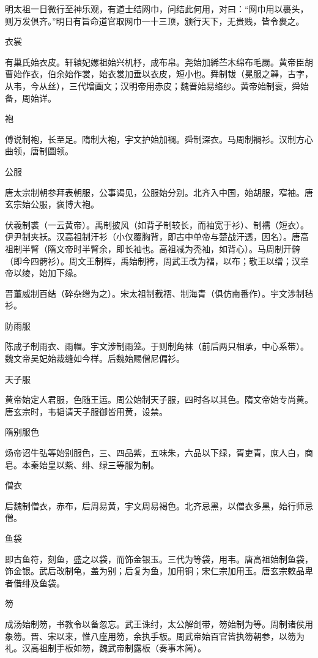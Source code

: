 \documentclass[a4paper,12pt,UTF8,twoside]{ctexbook}
\begin{document}
    明太祖一日微行至神乐观，有道士结网巾，问结此何用，对曰：“网巾用以裹头，则万发俱齐。”明日有旨命道官取网巾一十三顶，颁行天下，无贵贱，皆令裹之。
    
    衣裳
    
    有巢氏始衣皮。轩辕妃嫘祖始兴机杼，成布帛。尧始加絺苎木绵布毛罽。黄帝臣胡曹始作衣，伯余始作裳，始衣裳加垂以衣皮，短小也。舜制韨（冕服之韠，古字，从韦，今从丝），三代增画文；汉明帝用赤皮；魏晋始易络纱。黄帝始制衮，舜始备，周始详。
    
    袍
    
    傅说制袍，长至足。隋制大袍，宇文护始加襕。舜制深衣。马周制襕衫。汉制方心曲领，唐制圆领。
    
    公服
    
    唐太宗制朝参拜表朝服，公事谒见，公服始分别。北齐入中国，始胡服，窄袖。唐玄宗始公服，褒博大袍。
    
    伏羲制裘（一云黄帝）。禹制披风（如背子制较长，而袖宽于衫）、制襦（短衣）。伊尹制夹袄。汉高祖制汗衫（小仅覆胸背，即古中单帝与楚战汗透，因名）。唐高祖制半臂（隋文帝时半臂余，即长袖也。高祖减为秃袖，如背心）。马周制开骻（即今四骻衫）。周文王制裈，禹始制袴，周武王改为褶，以布；敬王以缯；汉章帝以绫，始加下缘。
    
    晋董威制百结（碎杂缯为之）。宋太祖制截褶、制海青（俱仿南番作）。宇文涉制毡衫。
    
    防雨服
    
    陈成子制雨衣、雨帽。宇文涉制雨笼。于则制角袜（前后两只相承，中心系带）。魏文帝吴妃始裁缝如今样。后魏始赐僧尼偏衫。
    
    天子服
    
    黄帝始定人君服，色随王运。周公始制天子服，四时各以其色。隋文帝始专尚黄。唐玄宗时，韦韬请天子服御皆用黄，设禁。
    
    隋别服色
    
    炀帝诏牛弘等始别服色，三、四品紫，五味朱，六品以下绿，胥吏青，庶人白，商皂。本秦始皇以紫、绯、绿三等服为制。
    
    僧衣
    
    后魏制僧衣，赤布，后周易黄，宇文周易褐色。北齐忌黑，以僧衣多黑，始行师忌僧。
    
    鱼袋
    
    即古鱼符，刻鱼，盛之以袋，而饰金银玉。三代为等袋，用韦。唐高祖始制鱼袋，饰金银。武后改制龟，盖为别；后复为鱼，加用铜；宋仁宗加用玉。唐玄宗敕品卑者借绯及鱼袋。
    
    笏
    
    成汤始制笏，书教令以备忽忘。武王诛纣，太公解剑带，笏始制为等。周制诸侯用象笏。晋、宋以来，惟八座用笏，余执手板。周武帝始百官皆执笏朝参，以笏为礼。汉高祖制手板如笏，魏武帝制露板（奏事木简）。
    
\end{document}
